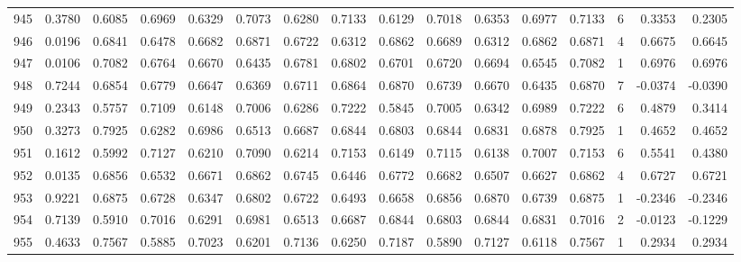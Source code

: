 \begin{tabular}{lrrrrrrrrrrrrrrr}
945 &      0.3780 &  0.6085 &  0.6969 &  0.6329 &  0.7073 &  0.6280 &  0.7133 &  0.6129 &  0.7018 &  0.6353 &   0.6977 &     0.7133 &      6 &                    0.3353 &                     0.2305 \\
946 &      0.0196 &  0.6841 &  0.6478 &  0.6682 &  0.6871 &  0.6722 &  0.6312 &  0.6862 &  0.6689 &  0.6312 &   0.6862 &     0.6871 &      4 &                    0.6675 &                     0.6645 \\
947 &      0.0106 &  0.7082 &  0.6764 &  0.6670 &  0.6435 &  0.6781 &  0.6802 &  0.6701 &  0.6720 &  0.6694 &   0.6545 &     0.7082 &      1 &                    0.6976 &                     0.6976 \\
948 &      0.7244 &  0.6854 &  0.6779 &  0.6647 &  0.6369 &  0.6711 &  0.6864 &  0.6870 &  0.6739 &  0.6670 &   0.6435 &     0.6870 &      7 &                   -0.0374 &                    -0.0390 \\
949 &      0.2343 &  0.5757 &  0.7109 &  0.6148 &  0.7006 &  0.6286 &  0.7222 &  0.5845 &  0.7005 &  0.6342 &   0.6989 &     0.7222 &      6 &                    0.4879 &                     0.3414 \\
950 &      0.3273 &  0.7925 &  0.6282 &  0.6986 &  0.6513 &  0.6687 &  0.6844 &  0.6803 &  0.6844 &  0.6831 &   0.6878 &     0.7925 &      1 &                    0.4652 &                     0.4652 \\
951 &      0.1612 &  0.5992 &  0.7127 &  0.6210 &  0.7090 &  0.6214 &  0.7153 &  0.6149 &  0.7115 &  0.6138 &   0.7007 &     0.7153 &      6 &                    0.5541 &                     0.4380 \\
952 &      0.0135 &  0.6856 &  0.6532 &  0.6671 &  0.6862 &  0.6745 &  0.6446 &  0.6772 &  0.6682 &  0.6507 &   0.6627 &     0.6862 &      4 &                    0.6727 &                     0.6721 \\
953 &      0.9221 &  0.6875 &  0.6728 &  0.6347 &  0.6802 &  0.6722 &  0.6493 &  0.6658 &  0.6856 &  0.6870 &   0.6739 &     0.6875 &      1 &                   -0.2346 &                    -0.2346 \\
954 &      0.7139 &  0.5910 &  0.7016 &  0.6291 &  0.6981 &  0.6513 &  0.6687 &  0.6844 &  0.6803 &  0.6844 &   0.6831 &     0.7016 &      2 &                   -0.0123 &                    -0.1229 \\
955 &      0.4633 &  0.7567 &  0.5885 &  0.7023 &  0.6201 &  0.7136 &  0.6250 &  0.7187 &  0.5890 &  0.7127 &   0.6118 &     0.7567 &      1 &                    0.2934 &                     0.2934 \\

\end{tabular}
